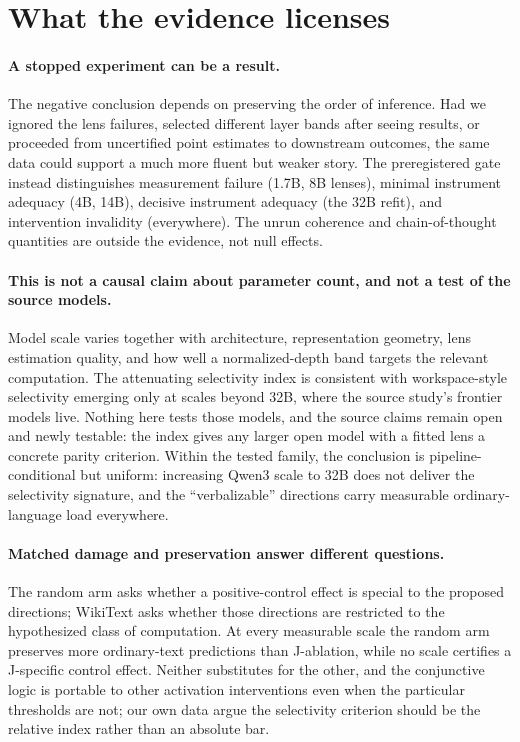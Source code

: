 \documentclass{article}
\begin{document}
\section{What the evidence licenses}

\paragraph{A stopped experiment can be a result.}
The negative conclusion depends on preserving the order of inference. Had we ignored the
lens failures, selected different layer bands after seeing results, or proceeded from
uncertified point estimates to downstream outcomes, the same data could support a much
more fluent but weaker story. The preregistered gate instead distinguishes measurement
failure (1.7B, 8B lenses), minimal instrument adequacy (4B, 14B), decisive instrument
adequacy (the 32B refit), and intervention invalidity (everywhere). The unrun coherence
and chain-of-thought quantities are outside the evidence, not null effects.

\paragraph{This is not a causal claim about parameter count, and not a test of the
source models.}
Model scale varies together with architecture, representation geometry, lens estimation
quality, and how well a normalized-depth band targets the relevant computation. The
attenuating selectivity index is consistent with workspace-style selectivity emerging
only at scales beyond 32B, where the source study's frontier models live. Nothing here
tests those models, and the source claims remain open and newly testable: the index
gives any larger open model with a fitted lens a concrete parity criterion. Within the
tested family, the conclusion is pipeline-conditional but uniform: increasing Qwen3 scale
to 32B does not deliver the selectivity signature, and the ``verbalizable'' directions
carry measurable ordinary-language load everywhere.

\paragraph{Matched damage and preservation answer different questions.}
The random arm asks whether a positive-control effect is special to the proposed
directions; WikiText asks whether those directions are restricted to the hypothesized
class of computation. At every measurable scale the random arm preserves more
ordinary-text predictions than J-ablation, while no scale certifies a J-specific control
effect. Neither substitutes for the other, and the conjunctive logic is portable to other
activation interventions even when the particular thresholds are not; our own data argue
the selectivity criterion should be the relative index rather than an absolute bar.
\end{document}
